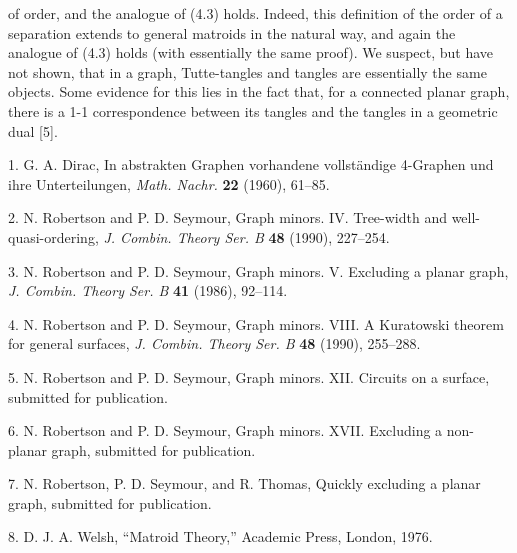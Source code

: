 \noindent of order, and the analogue of (4.3) holds. Indeed, this definition of the order of a separation extends to general matroids in the natural way, and again the analogue of (4.3) holds (with essentially the same proof). We suspect, but have not shown, that in a graph, Tutte-tangles and tangles are essentially the same objects. Some evidence for this lies in the fact that, for a connected planar graph, there is a 1-1 correspondence between its tangles and the tangles in a geometric dual [5].


1. G. A. Dirac, In abstrakten Graphen vorhandene vollst\"andige 4-Graphen und ihre Unterteilungen, \textit{Math. Nachr.} \textbf{22} (1960), 61--85.

2. N. Robertson and P. D. Seymour, Graph minors. IV. Tree-width and well-quasi-ordering, \textit{J. Combin. Theory Ser. B} \textbf{48} (1990), 227--254.

3. N. Robertson and P. D. Seymour, Graph minors. V. Excluding a planar graph, \textit{J. Combin. Theory Ser. B} \textbf{41} (1986), 92--114.

4. N. Robertson and P. D. Seymour, Graph minors. VIII. A Kuratowski theorem for general surfaces, \textit{J. Combin. Theory Ser. B} \textbf{48} (1990), 255--288.

5. N. Robertson and P. D. Seymour, Graph minors. XII. Circuits on a surface, submitted for publication.

6. N. Robertson and P. D. Seymour, Graph minors. XVII. Excluding a non-planar graph, submitted for publication.

7. N. Robertson, P. D. Seymour, and R. Thomas, Quickly excluding a planar graph, submitted for publication.

8. D. J. A. Welsh, ``Matroid Theory,'' Academic Press, London, 1976.
